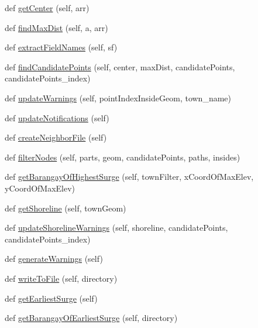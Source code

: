 \begin{DoxyCompactItemize}
\item 
def \hyperlink{classsurgewarnings_1_1_warnings_a025bcd7b04a461fd40445972ca166bbe}{get\+Center} (self, arr)
\item 
def \hyperlink{classsurgewarnings_1_1_warnings_a3fcdd65a521fb12aa4f3544f841bc7b5}{find\+Max\+Dist} (self, a, arr)
\item 
def \hyperlink{classsurgewarnings_1_1_warnings_a992fbd4199da7b2aeda9c3be336200e9}{extract\+Field\+Names} (self, sf)
\item 
def \hyperlink{classsurgewarnings_1_1_warnings_a67e6c3208a33f1620454580a018c5516}{find\+Candidate\+Points} (self, center, max\+Dist, candidate\+Points, candidate\+Points\+\_\+index)
\item 
def \hyperlink{classsurgewarnings_1_1_warnings_ac5875450ac1313999fd8a7127543f0f5}{update\+Warnings} (self, point\+Index\+Inside\+Geom, town\+\_\+name)
\item 
def \hyperlink{classsurgewarnings_1_1_warnings_a960bbaebb1a191d7e74d9b9e05754766}{update\+Notifications} (self)
\item 
def \hyperlink{classsurgewarnings_1_1_warnings_a6ac5c7fb1ab3d7bf9daccfca7ac183b7}{create\+Neighbor\+File} (self)
\item 
def \hyperlink{classsurgewarnings_1_1_warnings_a6bdfef50b66307a75b7b4a4f4c97b0ed}{filter\+Nodes} (self, parts, geom, candidate\+Points, paths, insides)
\item 
def \hyperlink{classsurgewarnings_1_1_warnings_a9ef0cce494ad4c58409f42f75404b0c1}{get\+Barangay\+Of\+Highest\+Surge} (self, town\+Filter, x\+Coord\+Of\+Max\+Elev, y\+Coord\+Of\+Max\+Elev)
\item 
def \hyperlink{classsurgewarnings_1_1_warnings_a17a26fe213c40099a59b8ed42726a5db}{get\+Shoreline} (self, town\+Geom)
\item 
def \hyperlink{classsurgewarnings_1_1_warnings_ad68f8580d67d7efd1b35929f544bf752}{update\+Shoreline\+Warnings} (self, shoreline, candidate\+Points, candidate\+Points\+\_\+index)
\item 
def \hyperlink{classsurgewarnings_1_1_warnings_a4af53d5f9f9b182161d43bae6bf9982f}{generate\+Warnings} (self)
\item 
def \hyperlink{classsurgewarnings_1_1_warnings_acb21112591c0c2d77e465fea55f45567}{write\+To\+File} (self, directory)
\item 
def \hyperlink{classsurgewarnings_1_1_warnings_af8152a83c22df2f1d187c5fe963e57a8}{get\+Earliest\+Surge} (self)
\item 
def \hyperlink{classsurgewarnings_1_1_warnings_a35fc7b1105cb4cc68dbf7cda4d319120}{get\+Barangay\+Of\+Earliest\+Surge} (self, directory)
\end{DoxyCompactItemize}
